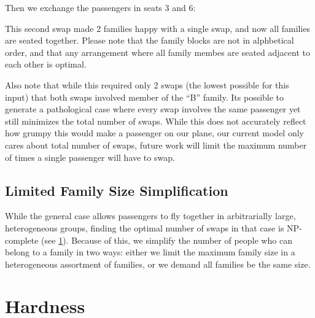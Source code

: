 \documentclass[11pt,twocolumn]{article}
\begin{document}
Then we exchange the passengers in seats 3 and 6:

\begin{figure}[H]
\centering
{}
\end{figure}

This second swap made 2 families happy with a single swap, and now all families are seated together. Please note that the family blocks are not in alphbetical order, and that any arrangement where all family membes are seated adjacent to each other is optimal.  

Also note that while this required only 2 swaps (the lowest possible for this input) that both swaps involved member of the ``B'' family.  Its possible to generate a pathological case where every swap involves the same passenger yet still minimizes the total number of swaps.  While this does not accurately reflect how grumpy this would make a passenger on our plane, our current model only cares about total number of swaps, future work will limit the maximum number of times a single passenger will have to swap.

\subsection{Limited Family Size Simplification}

While the general case allows passengers to fly together in arbitrarially large, heterogeneous groups, finding the optimal number of swaps in that case is NP-complete (see \ref{sec:hardness}).  Because of this, we simplify the number of people who can belong to a family in two ways: either we limit the maximum family size in a heterogeneous assortment of families, or we demand all families be the same size.  

\section{Hardness} \label{sec:hardness}
\end{document}
